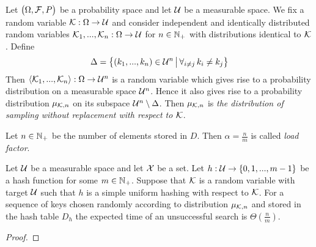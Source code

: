 \begin{definition}
Let $\big(\Omega, {\mathcal F}, P \big)$ be a probability space and let ${\mathcal U}$ be a measurable space. We fix a random variable ${\mathcal K}:\Omega\rightarrow {\mathcal U}$ and consider independent and identically distributed random variables ${\mathcal K}_1,...,{\mathcal K}_n:\Omega \rightarrow {\mathcal U}$ for $n\in {\mathbb N}_+$ with distributions identical to ${\mathcal K}$. Define
$$\Delta = \big\{(k_1,...,k_n) \in {\mathcal U}^n\,\big|\,\forall_{i\neq j}\,k_i\neq k_j\big\}$$
Then $\langle {\mathcal K}_1,...,{\mathcal K}_n\rangle:\Omega \rightarrow {\mathcal U}^n$ is a random variable which gives rise to a probability distribution on a measurable space ${\mathcal U}^n$. Hence it also gives rise to a probability distribution $\mu_{{\mathcal K},n}$ on its subspace ${\mathcal U}^n\setminus \Delta$. Then $\mu_{{\mathcal K},n}$ is \textit{the distribution of sampling without replacement with respect to ${\mathcal K}$}.
\end{definition}

\begin{definition}
 Let $n\in {\mathbb N}_+$ be the number of elements stored in $D$. Then $\alpha = \frac{n}{m}$ is called \textit{load factor}.
\end{definition}

\begin{theorem}\label{theorem:unsuccessful_search_simple_uniform_hashing}
Let ${\mathcal U}$ be a measurable space and let ${\mathcal X}$ be a set. Let $h:{\mathcal U}\rightarrow \{0,1,...,m-1\}$ be a hash function for some $m\in {\mathbb N}_+$. Suppose that ${\mathcal K}$ is a random variable with target ${\mathcal U}$ such that $h$ is a simple uniform hashing with respect to ${\mathcal K}$. For a sequence of keys chosen randomly according to distribution $\mu_{{\mathcal K},n}$ and stored in the hash table $D_h$ the expected time of an unsuccessful search is $\Theta(\frac{n}{m})$.
\end{theorem}
\begin{proof}

\end{proof}



